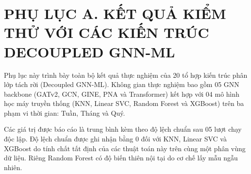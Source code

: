 \chapter{PHỤ LỤC A. KẾT QUẢ KIỂM THỬ VỚI CÁC KIẾN TRÚC DECOUPLED GNN-ML}

\indent\indent Phụ lục này trình bày toàn bộ kết quả thực nghiệm của 20 tổ hợp kiến trúc phân lớp tách rời (Decoupled GNN-ML). Không gian thực nghiệm bao gồm 05 GNN backbone (GATv2, GCN, GINE, PNA và Transformer) kết hợp với 04 mô hình học máy truyền thống (KNN, Linear SVC, Random Forest và XGBoost) trên ba phạm vi thời gian: Tuần, Tháng và Quý.\vspace{.3cm}

Các giá trị được báo cáo là trung bình kèm theo độ lệch chuẩn sau 05 lượt chạy độc lập. Độ lệch chuẩn được ghi nhận bằng $0$ đối với KNN, Linear SVC và XGBoost do tính chất tất định của các thuật toán này trên cùng một phân vùng dữ liệu. Riêng Random Forest có độ biến thiên nội tại do cơ chế lấy mẫu ngẫu nhiên.


